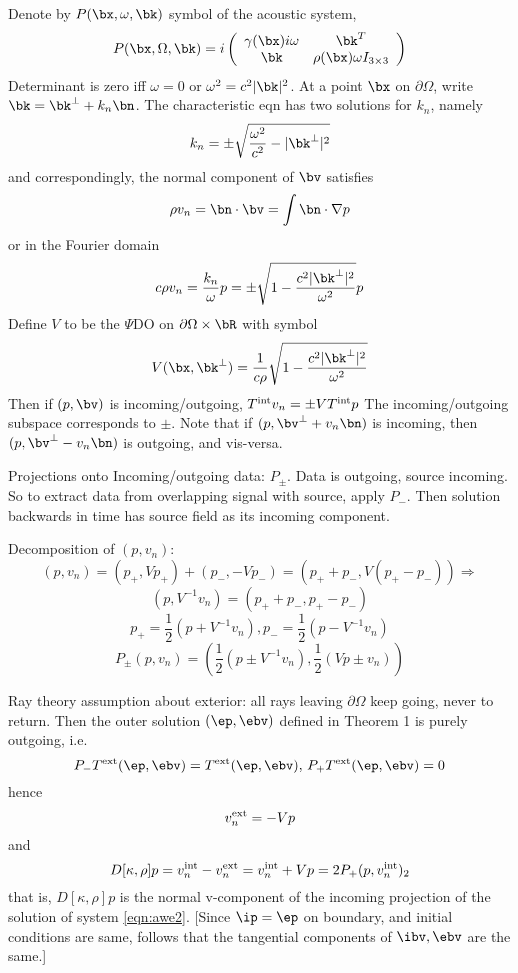 Denote by $P(\bx,\omega,\bk)$ symbol of the acoustic system,
\[
P(\bx,\Omega,\bk) = 
i\left(
\begin{array}{cc}
\gamma(\bx)i\omega & \bk^T\\
\bk &  \rho(\bx)\omega I_{3\times3}
\end{array}
\right)
\]
Determinant is zero iff $\omega=0$ or $\omega^2 = c^2|\bk|^2$.
At a point $\bx$ on $\partial \Omega$, write $\bk = \bk^{\perp} +
k_n\bn$. The characteristic eqn has two solutions for $k_n$, namely
\[
k_n = \pm \sqrt{\frac{\omega^2}{c^2}-|\bk^{\perp}|^2}
\]
and correspondingly, the normal component of $\bv$ satisfies
\[
\rho v_n = \bn \cdot \bv = \int \bn \cdot \nabla p
\]
or in the Fourier domain 
\[
c \rho v_n = \frac{k_n}{\omega} p = \pm
\sqrt{1-\frac{c^2|\bk^{\perp}|^2}{\omega^2}}p
\]
Define $V$ to be the $\Psi$DO on $\partial \Omega \times \bR$ with symbol
\[
V(\bx,\bk^{\perp})=\frac{1}{c\rho}\sqrt{1-\frac{c^2|\bk^{\perp}|^2}{\omega^2}}
\]
Then if $(p,\bv)$ is incoming/outgoing, $T^{\rm int}v_n = \pm VT^{\rm int}p$ 
The incoming/outgoing subspace corresponds to $\pm$.
Note that if $(p, \bv^{\perp} + v_n\bn)$ is incoming, then $(p,
\bv^{\perp} - v_n\bn)$ is outgoing, and vis-versa. 

Projections onto Incoming/outgoing data: $P_{\pm}$. Data is outgoing,
source incoming. So to extract data from overlapping signal with 
source, apply $P_-$. Then solution backwards in time has source field 
as its incoming component. 

Decomposition of $(p,v_n)$: 
\[
(p,v_n) = (p_+, Vp_+) + (p_-,-Vp_-) = (p_++p_-, V(p_+-p_-)) \Rightarrow
\]
\[
(p,V^{-1}v_n) = (p_++p_-,p_+-p_-)
\]
\[
p_+ = \frac{1}{2}(p + V^{-1}v_n), p_-=\frac{1}{2}(p-V^{-1}v_n)
\]
\[
P_{\pm}(p,v_n) = \left( \frac{1}{2}(p \pm V^{-1}v_n),  \frac{1}{2}(Vp \pm
  v_n)\right)
\]

Ray theory assumption about exterior: all rays leaving $\partial
\Omega$ keep going, never to return. Then the outer solution
$(\ep,\ebv)$ defined in Theorem 1 is purely outgoing, i.e. 
\[
P_-T^{\rm ext}(\ep,\ebv) = T^{\rm ext}(\ep,\ebv), \,P_+T^{\rm ext}(\ep,\ebv) = 0
\]
hence
\[
v_n^{\rm ext} = -Vp 
\]
and
\begin{equation}
\label{eqn:did}
D[\kappa,\rho]p = v_n^{\rm int}-v_n^{\rm ext} = v_n^{\rm int}+Vp =
2 P_+(p,v^{\rm int}_n)_2
\end{equation}
that is, $D[\kappa,\rho]p$ is the normal v-component of the incoming projection of the
solution of system \ref{eqn:awe2}.
[Since $\ip=\ep$ on boundary, and initial conditions are same, follows
that the tangential components of $\ibv, \ebv$ are the same.]

